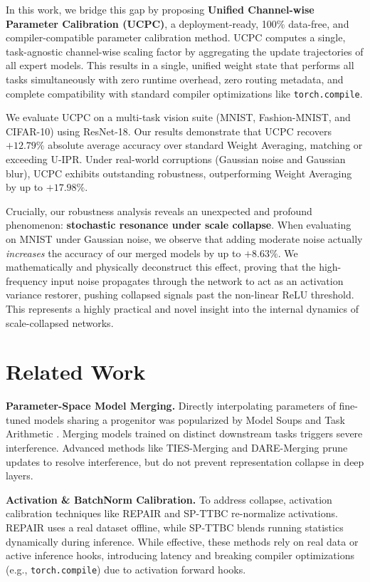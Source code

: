 \documentclass{article}
\theoremstyle{plain}
\theoremstyle{definition}
\theoremstyle{remark}
\begin{document}
In this work, we bridge this gap by proposing \textbf{Unified Channel-wise Parameter Calibration (UCPC)}, a deployment-ready, 100\% data-free, and compiler-compatible parameter calibration method. UCPC computes a single, task-agnostic channel-wise scaling factor by aggregating the update trajectories of all expert models. This results in a single, unified weight state that performs all tasks simultaneously with zero runtime overhead, zero routing metadata, and complete compatibility with standard compiler optimizations like \texttt{torch.compile}.

We evaluate UCPC on a multi-task vision suite (MNIST, Fashion-MNIST, and CIFAR-10) using ResNet-18. Our results demonstrate that UCPC recovers $+12.79\%$ absolute average accuracy over standard Weight Averaging, matching or exceeding U-IPR. Under real-world corruptions (Gaussian noise and Gaussian blur), UCPC exhibits outstanding robustness, outperforming Weight Averaging by up to $+17.98\%$.

Crucially, our robustness analysis reveals an unexpected and profound phenomenon: \textbf{stochastic resonance under scale collapse}. When evaluating on MNIST under Gaussian noise, we observe that adding moderate noise actually \textit{increases} the accuracy of our merged models by up to $+8.63\%$. We mathematically and physically deconstruct this effect, proving that the high-frequency input noise propagates through the network to act as an activation variance restorer, pushing collapsed signals past the non-linear ReLU threshold. This represents a highly practical and novel insight into the internal dynamics of scale-collapsed networks.

\section{Related Work}
\label{sec:related}

\textbf{Parameter-Space Model Merging.} Directly interpolating parameters of fine-tuned models sharing a progenitor was popularized by Model Soups \cite{wortsman22} and Task Arithmetic \cite{ilharco23}. Merging models trained on distinct downstream tasks triggers severe interference. Advanced methods like TIES-Merging \cite{yadav23} and DARE-Merging \cite{yu24} prune updates to resolve interference, but do not prevent representation collapse in deep layers.

\textbf{Activation \& BatchNorm Calibration.} To address collapse, activation calibration techniques like REPAIR \cite{jordan23} and SP-TTBC \cite{anonymous26a} re-normalize activations. REPAIR uses a real dataset offline, while SP-TTBC blends running statistics dynamically during inference. While effective, these methods rely on real data or active inference hooks, introducing latency and breaking compiler optimizations (e.g., \texttt{torch.compile}) due to activation forward hooks.
\end{document}
